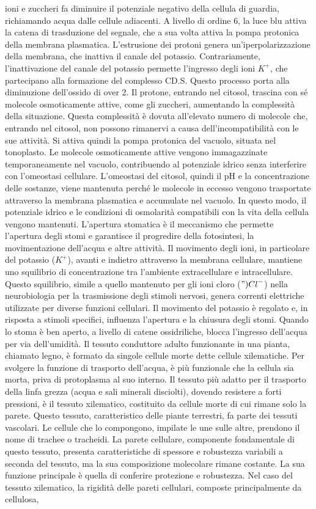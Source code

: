 \documentclass[11pt, a4paper]{article}
\begin{document}
\begin{spacing}{1.15}
ioni e zuccheri fa diminuire il potenziale negativo della cellula di guardia, richiamando acqua dalle cellule adiacenti. A livello di ordine 6, la luce blu attiva la catena di trasduzione del segnale, che a sua volta attiva la pompa protonica della membrana plasmatica. L'estrusione dei protoni genera un'iperpolarizzazione della membrana, che inattiva il canale del potassio. Contrariamente, l'inattivazione del canale del potassio permette l'ingresso degli ioni $K^{+}$, che partecipano alla formazione del complesso CD.S. Questo processo porta alla diminuzione dell'ossido di over 2. Il protone, entrando nel citosol, trascina con sé molecole osmoticamente attive, come gli zuccheri, aumentando la complessità della situazione. Questa complessità è dovuta all'elevato numero di molecole che, entrando nel citosol, non possono rimanervi a causa dell'incompatibilità con le sue attività. Si attiva quindi la pompa protonica del vacuolo, situata nel tonoplasto. Le molecole osmoticamente attive vengono immagazzinate temporaneamente nel vacuolo, contribuendo al potenziale idrico senza interferire con l'omeostasi cellulare.  L'omeostasi del citosol, quindi il pH e la concentrazione delle sostanze, viene mantenuta perché le molecole in eccesso vengono trasportate attraverso la membrana plasmatica e accumulate nel vacuolo. In questo modo, il potenziale idrico e le condizioni di osmolarità compatibili con la vita della cellula vengono mantenuti. L'apertura stomatica è il meccanismo che permette l'apertura degli stomi e garantisce il progredire della fotosintesi, la movimentazione dell'acqua e altre attività. Il movimento degli ioni, in particolare del potassio ($K^+$), avanti e indietro attraverso la membrana cellulare, mantiene uno squilibrio di concentrazione tra l'ambiente extracellulare e intracellulare. Questo squilibrio, simile a quello mantenuto per gli ioni cloro ($"){Cl}^-$) nella neurobiologia per la trasmissione degli stimoli nervosi, genera correnti elettriche utilizzate per diverse funzioni cellulari.  Il movimento del potassio è regolato e, in risposta a stimoli specifici,  influenza l'apertura e la chiusura degli stomi. Quando lo stoma è ben aperto, a livello di catene ossidriliche, blocca l'ingresso dell'acqua per via dell'umidità. Il tessuto conduttore adulto funzionante in una pianta, chiamato legno, è formato da singole cellule morte dette cellule xilematiche. Per svolgere la funzione di trasporto dell'acqua, è più funzionale che la cellula sia morta, priva di protoplasma al suo interno. Il tessuto più adatto per il trasporto della linfa grezza (acqua e sali minerali disciolti), dovendo resistere a forti pressioni, è il tessuto xilematico, costituito da cellule morte di cui rimane solo la parete. Questo tessuto, caratteristico delle piante terrestri, fa parte dei tessuti vascolari. Le cellule che lo compongono, impilate le une sulle altre, prendono il nome di trachee o tracheidi. La parete cellulare, componente fondamentale di questo tessuto, presenta caratteristiche di spessore e robustezza variabili a seconda del tessuto, ma la sua composizione molecolare rimane costante. La sua funzione principale è quella di conferire protezione e robustezza. Nel caso del tessuto xilematico, la rigidità delle pareti cellulari, composte principalmente da cellulosa, 
\end{spacing}
\end{document}
